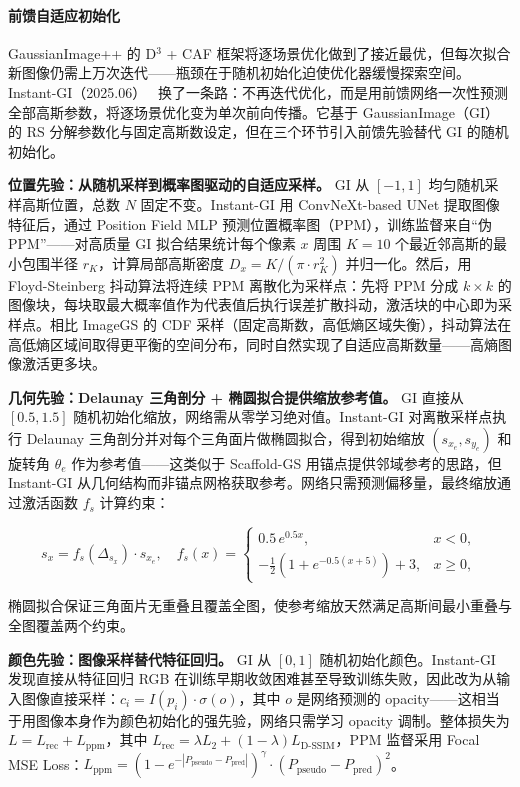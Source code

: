 \paragraph{前馈自适应初始化}

GaussianImage++ 的 D$^3$ + CAF 框架将逐场景优化做到了接近最优，但每次拟合新图像仍需上万次迭代——瓶颈在于随机初始化迫使优化器缓慢探索空间。Instant-GI（2025.06）~\cite{2506_23479} 换了一条路：不再迭代优化，而是用前馈网络一次性预测全部高斯参数，将逐场景优化变为单次前向传播。它基于 GaussianImage（GI）的 RS 分解参数化与固定高斯数设定，但在三个环节引入前馈先验替代 GI 的随机初始化。

\textbf{位置先验：从随机采样到概率图驱动的自适应采样。} GI 从 $[-1, 1]$ 均匀随机采样高斯位置，总数 $N$ 固定不变。Instant-GI 用 ConvNeXt-based UNet 提取图像特征后，通过 Position Field MLP 预测位置概率图（PPM），训练监督来自``伪 PPM''——对高质量 GI 拟合结果统计每个像素 $x$ 周围 $K=10$ 个最近邻高斯的最小包围半径 $r_K$，计算局部高斯密度 $D_x = K / (\pi \cdot r_K^2)$ 并归一化。然后，用 Floyd-Steinberg 抖动算法将连续 PPM 离散化为采样点：先将 PPM 分成 $k \times k$ 的图像块，每块取最大概率值作为代表值后执行误差扩散抖动，激活块的中心即为采样点。相比 ImageGS 的 CDF 采样（固定高斯数，高低熵区域失衡），抖动算法在高低熵区域间取得更平衡的空间分布，同时自然实现了自适应高斯数量——高熵图像激活更多块。

\textbf{几何先验：Delaunay 三角剖分 + 椭圆拟合提供缩放参考值。} GI 直接从 $[0.5, 1.5]$ 随机初始化缩放，网络需从零学习绝对值。Instant-GI 对离散采样点执行 Delaunay 三角剖分并对每个三角面片做椭圆拟合，得到初始缩放 $(s_{x_e}, s_{y_e})$ 和旋转角 $\theta_e$ 作为参考值——这类似于 Scaffold-GS 用锚点提供邻域参考的思路，但 Instant-GI 从几何结构而非锚点网格获取参考。网络只需预测偏移量，最终缩放通过激活函数 $f_s$ 计算约束：

\begin{equation}
s_x = f_s(\Delta_{s_x}) \cdot s_{x_e}, \quad f_s(x) = \begin{cases} 0.5 \, e^{0.5x}, & x < 0, \\ -\tfrac{1}{2}(1 + e^{-0.5(x+5)}) + 3, & x \geq 0, \end{cases}
\end{equation}

椭圆拟合保证三角面片无重叠且覆盖全图，使参考缩放天然满足高斯间最小重叠与全图覆盖两个约束。

\textbf{颜色先验：图像采样替代特征回归。} GI 从 $[0, 1]$ 随机初始化颜色。Instant-GI 发现直接从特征回归 RGB 在训练早期收敛困难甚至导致训练失败，因此改为从输入图像直接采样：$c_i = I(p_i) \cdot \sigma(o)$，其中 $o$ 是网络预测的 opacity——这相当于用图像本身作为颜色初始化的强先验，网络只需学习 opacity 调制。整体损失为 $L = L_{\text{rec}} + L_{\text{ppm}}$，其中 $L_{\text{rec}} = \lambda L_2 + (1 - \lambda) L_{\text{D-SSIM}}$，PPM 监督采用 Focal MSE Loss：$L_{\text{ppm}} = (1 - e^{-|P_{\text{pseudo}} - P_{\text{pred}}|})^\gamma \cdot (P_{\text{pseudo}} - P_{\text{pred}})^2$。

